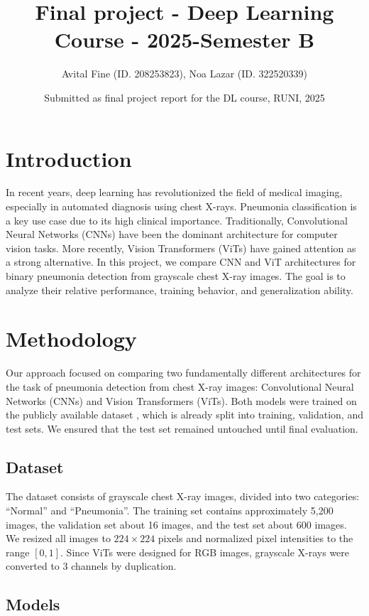\documentclass{article}
\title{Final project - Deep Learning Course - 2025-Semester B}
\author{Avital Fine (ID. 208253823), Noa Lazar (ID. 322520339)}
\date{Submitted as final project report for the DL course, RUNI, 2025}
\begin{document}
\maketitle

\section{Introduction}
In recent years, deep learning has revolutionized the field of medical imaging, especially in automated diagnosis using chest X-rays. Pneumonia classification is a key use case due to its high clinical importance. Traditionally, Convolutional Neural Networks (CNNs) have been the dominant architecture for computer vision tasks. More recently, Vision Transformers (ViTs) \citep{https://arxiv.org/pdf/2010.11929} have gained attention as a strong alternative.  
In this project, we compare CNN and ViT architectures for binary pneumonia detection from grayscale chest X-ray images. The goal is to analyze their relative performance, training behavior, and generalization ability.

\section{Methodology}

Our approach focused on comparing two fundamentally different architectures for the task of pneumonia detection from chest X-ray images: Convolutional Neural Networks (CNNs) and Vision Transformers (ViTs). Both models were trained on the publicly available dataset \cite{https://www.kaggle.com/datasets/paultimothymooney/chest-xray-pneumonia}, which is already split into training, validation, and test sets. We ensured that the test set remained untouched until final evaluation.

\subsection{Dataset}
The dataset consists of grayscale chest X-ray images, divided into two categories: ``Normal'' and ``Pneumonia''. The training set contains approximately 5,200 images, the validation set about 16 images, and the test set about 600 images. We resized all images to $224 \times 224$ pixels and normalized pixel intensities to the range $[0,1]$. Since ViTs were designed for RGB images, grayscale X-rays were converted to 3 channels by duplication.

\subsection{Models}
\end{document}
